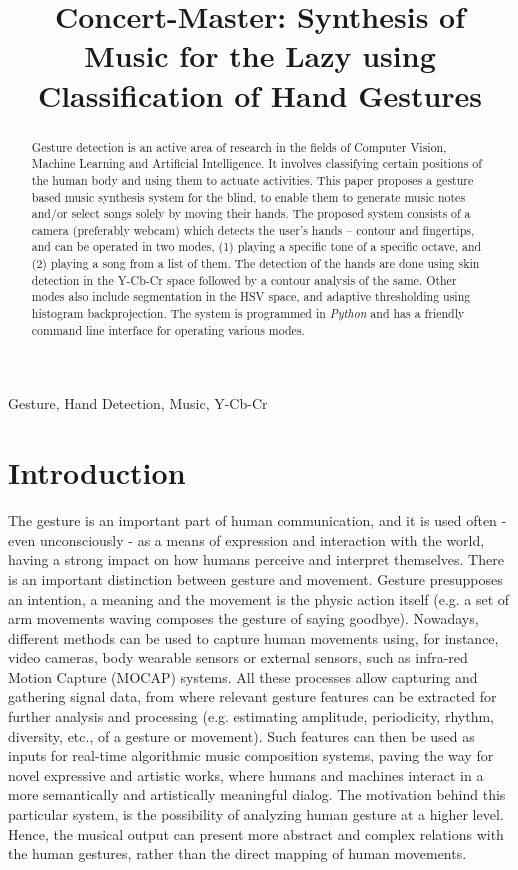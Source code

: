 \documentclass[letterpaper, 10 pt, twoside, conference]{ieeeconf}
\title{Concert-Master: Synthesis of Music for the Lazy using Classification of Hand Gestures}
\begin{document}
%
\maketitle
%
\begin{abstract}

Gesture detection is an active area of research in the fields of Computer Vision,
Machine Learning and Artificial Intelligence. It involves classifying certain
positions of the human body and using them to actuate activities. This paper
proposes a gesture based music synthesis system for the blind, to enable them
to generate music notes and/or select songs solely by moving their hands. The
proposed system consists of a camera (preferably webcam) which detects the user's
hands -- contour and fingertips, and can be operated in two modes, (1) playing a
specific tone of a specific octave, and (2) playing a song from a list of them.
The detection of the hands are done using skin detection in the Y-Cb-Cr space
followed by a contour analysis of the same. Other modes also include segmentation
in the HSV space, and adaptive thresholding using histogram backprojection.
The system is programmed in \textit{Python} and has a friendly command line
interface for operating various modes.
\end{abstract}
%
\begin{keywords}
Gesture, Hand Detection, Music, Y-Cb-Cr
\end{keywords}
%
\section{Introduction}
\label{sec:intro}

The gesture is an important part of human communication,
and it is used often - even unconsciously - as a means of expression and interaction with the world, having a strong impact on how humans perceive and interpret themselves. There is an important distinction between gesture and movement. Gesture presupposes an intention, a meaning and the movement is the physic action itself (e.g. a set of arm movements waving composes the gesture of saying goodbye). Nowadays, different methods can be used to capture human
movements using, for instance, video cameras, body wearable sensors or external sensors, such as infra-red Motion Capture (MOCAP) systems. All these processes allow capturing and gathering signal data, from where relevant gesture features can be extracted for further analysis and processing (e.g. estimating amplitude, periodicity, rhythm, diversity, etc., of a gesture or movement). Such features can then be used as inputs for real-time algorithmic music composition systems, paving the way for novel expressive and artistic works, where humans and machines interact in a more semantically and artistically meaningful dialog. The motivation behind this particular system, is the possibility of analyzing human gesture at a higher level. Hence, the musical output can present more abstract and complex relations with the human gestures, rather than the direct mapping of human movements.
\end{document}
